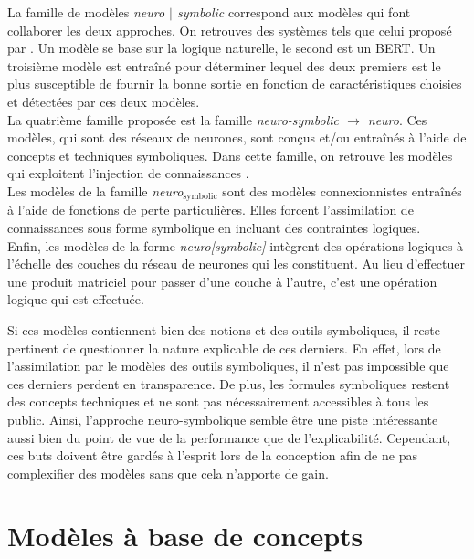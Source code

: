\documentclass{report}
\newcommand{\alh}[1]{\textcolor{teal}{#1}}
\begin{document}
    La famille de modèles \emph{neuro $\mid$ symbolic} correspond aux modèles qui font collaborer les deux approches. On retrouves des systèmes tels que celui proposé par \cite{kalouli_hy-nli_2020}. Un modèle se base sur la logique naturelle, le second est un BERT. Un troisième modèle est entraîné pour déterminer lequel des deux premiers est le plus susceptible de fournir la bonne sortie en fonction de caractéristiques choisies et détectées par ces deux modèles. \\
    La quatrième famille proposée est la famille \emph{neuro-symbolic $\rightarrow$ neuro}. Ces modèles, qui sont des réseaux de neurones, sont conçus et/ou entraînés à l'aide de concepts et techniques symboliques. Dans cette famille, on retrouve les modèles qui exploitent l'injection de connaissances \cite{ciatto_symbolic_2024}.\\
    Les modèles de la famille \emph{neuro$_{\text{symbolic}}$ } sont des modèles connexionnistes entraînés à l'aide de fonctions de perte particulières. Elles forcent l'assimilation de connaissances sous forme symbolique en incluant des contraintes logiques.\\
    Enfin, les modèles de la forme \emph{neuro[symbolic]} intègrent des opérations logiques à l'échelle des couches du réseau de neurones qui les constituent. Au lieu d'effectuer une produit matriciel pour passer d'une couche à l'autre, c'est une opération logique qui est effectuée.
    
    Si ces modèles contiennent bien des notions et des outils symboliques, il reste pertinent de questionner la nature explicable de ces derniers. En effet, lors de l'assimilation par le modèles des outils symboliques, il n'est pas impossible que ces derniers perdent en transparence. De plus, les formules symboliques restent des concepts techniques et ne sont pas nécessairement accessibles à tous les public. Ainsi, l'approche neuro-symbolique semble être une piste intéressante aussi bien du point de vue de la performance que de l'explicabilité. Cependant, ces buts doivent être gardés à l'esprit lors de la conception afin de ne pas complexifier des modèles sans que cela n'apporte de gain.
    
    
    
\section{Modèles à base de concepts}
\label{sec:modelesconcepts}
\end{document}
